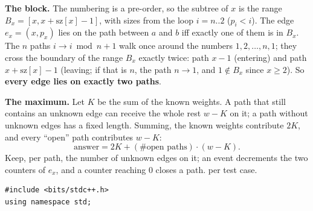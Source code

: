 \begin{solutionbox}
\textbf{The block.} The numbering is a pre-order, so the subtree of $x$ is the range $B_x = [x, x + \mathrm{sz}[x] - 1]$, with sizes from the loop $i = n..2$ ($p_i < i$). The edge $e_x = (x, p_x)$ lies on the path between $a$ and $b$ iff exactly one of them is in $B_x$. The $n$ paths $i \to i \bmod n + 1$ walk once around the numbers $1, 2, \dots, n, 1$; they cross the boundary of the range $B_x$ exactly twice: path $x - 1$ (entering) and path $x + \mathrm{sz}[x] - 1$ (leaving; if that is $n$, the path $n \to 1$, and $1 \notin B_x$ since $x \ge 2$). So \textbf{every edge lies on exactly two paths}.

\textbf{The maximum.} Let $K$ be the sum of the known weights. A path that still contains an unknown edge can receive the whole rest $w - K$ on it; a path without unknown edges has a fixed length. Summing, the known weights contribute $2K$, and every ``open'' path contributes $w - K$:
\[
    \text{answer} = 2K + (\#\text{open paths}) \cdot (w - K).
\]
Keep, per path, the number of unknown edges on it; an event decrements the two counters of $e_x$, and a counter reaching 0 closes a path.  per test case.
\begin{lstlisting}[style=cpp]
#include <bits/stdc++.h>
using namespace std;


\end{lstlisting}
\end{solutionbox}
